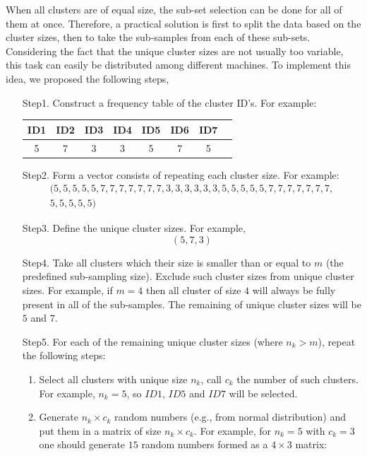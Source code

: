 \documentclass[11pt,a5paper,twoside]{book}
\begin{document}
When all clusters are of equal size, the sub-set selection can be done for all of them at once. Therefore, a practical solution is first to split the data based on the cluster sizes, then to take the sub-samples from each of these sub-sets. Considering the fact that the unique cluster sizes are not usually too  variable, this task can easily be distributed among different machines. To implement this idea, we proposed the following steps,

\begin{enumerate}
	\item [Step1. ] Construct a frequency table of the cluster ID's. For example:
	\begin{center}
		\begin{tabular}{ c c c c c c c c}
			ID1 & ID2 & ID3 & ID4 & ID5& ID6 & ID7 \\ \hline
			5 & 7 & 3  & 3 & 5 &7 &5 
		\end{tabular}
	\end{center}
	\item [Step2. ] Form a vector consists of repeating each cluster size. For example:
	\[	
	\begin{aligned}
	(5,5,5,5,5,7,7,7,7,7,7,7,3,3,3,3,3,3,5,5,5,5,5,7,7,7,7,7,7,7,\\ 5,5,5,5,5)
	\end{aligned}
	\]
	\item [Step3. ] Define the unique cluster sizes. For example,
	$$(5,7,3)$$
	\item [Step4. ] Take all clusters which their size is smaller than or equal to $m$ (the predefined sub-sampling size). Exclude such cluster sizes from unique cluster sizes. For example, if $m=4$ then all cluster of size $4$ will always be fully present in all of the sub-samples. The remaining of unique cluster sizes will be $5$ and $7$.
	\item [Step5. ] For each of the remaining unique cluster sizes (where $n_k > m$), repeat the following steps:
	\begin{enumerate}
		\item Select all clusters with unique size $n_k$, call $c_k$ the number of such clusters. For example, $n_k=5$, so $ID1$, $ID5$ and $ID7$ will be selected.
		\item Generate $n_k\times c_k$ random numbers (e.g., from normal distribution) and put them in a matrix of size $n_k \times c_k$. For example, for $n_k=5$ with $c_k=3$ one should generate $15$ random numbers formed as a $4\times 3$ matrix:
	\begin{center}

\end{center}
\end{enumerate}
\end{enumerate}
\end{document}
